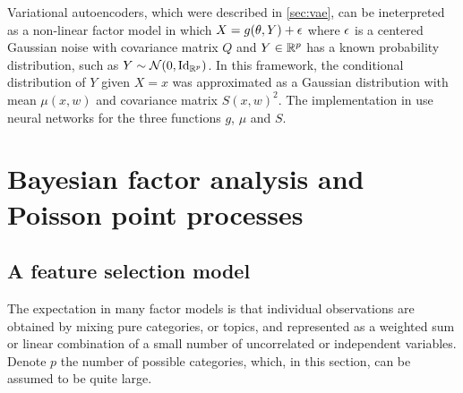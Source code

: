 Variational autoencoders, which were described in \cref{sec:vae}, can be ineterpreted as a non-linear factor model in which $X = g(\theta, Y) + \epsilon$ where $\epsilon$ is a centered Gaussian noise with covariance matrix $Q$ and $Y\in {\mathbb{R}}^p$ has a known probability distribution, such as $Y\sim \CN(0, \Id[p])$. In this framework, the conditional distribution of $Y$ given $X=x$ was approximated as a Gaussian distribution with mean $\mu(x, w)$ and covariance matrix $S(x, w)^2$. The implementation in \citet{kingma2014auto-encoding,kingma2019introduction} use neural networks for the three functions $g$, $\mu$ and $S$.





\section{Bayesian factor analysis and Poisson point processes}

\subsection{A feature selection model}
\label{sec:b.fact}
The expectation in many factor models is that individual observations are obtained by mixing pure categories, or topics, and represented as a weighted sum or linear combination of a small number of uncorrelated or independent variables. Denote  $p$ the number of possible categories, which, in this section, can be assumed to be quite large. 

